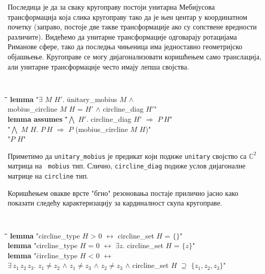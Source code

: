Последица је да за сваку кругоправу постоји унитарна Мебијусова
трансформација која слика кругоправу тако да је њен центар у
координатном почетку (заправо, постоје две такве трансформације ако су
сопствене вредности различите). Видећемо да унитарне трансформације
одговарају ротацијама Риманове сфере, тако да последња чињеница има
једноставно геометријско објашњење. Кругоправе се могу
дијагонализовати коришћењем само транслација, али унитарне
трансформације често имају лепша својства.

{\tt
\begin{tabbing}
\hspace{5mm}\=\hspace{5mm}\=\hspace{5mm}\=\hspace{5mm}\=\hspace{5mm}\=\kill
{\bf lemma} "$\exists$ $M$ $H'$. \= unitary\_mobius $M$ $\wedge$ \\
\>mobius\_circline $M$ $H$ = $H'$ $\wedge$ circline\_diag $H'$"\\
{\bf lemma} \={\bf assumes} \="$\bigwedge$ $H'$. circline\_diag $H'$ $\Longrightarrow$ $P\ H$"\\
\>\> "$\bigwedge$ $M$ $H$. $P\ H$ $\Longrightarrow$ $P$ (mobius\_circline $M$ $H$)"\\
\>"$P$ $H$"
\end{tabbing}
} 

\noindent Приметимо да {\tt unitary\_mobius} је предикат који подиже
{\tt unitary} својство са $\mathbb{C}^2$ матрица на {\tt
mobius} тип. Слично, {\tt circline\_diag} подиже услов
дијагоналне матрице на {\tt circline} тип.

Коришћењем овакве врсте "бгно" резоновања постаје прилично јасно како
показати следећу карактеризацију за кардиналност скупа кругоправе.

{\tt
\begin{tabbing}
\hspace{5mm}\=\hspace{5mm}\=\hspace{5mm}\=\hspace{5mm}\=\hspace{5mm}\=\kill
{\bf lemma} "circline\_type $H$ > $0$ $\longleftrightarrow$ circline\_set $H$ = $\{\}$"\\
{\bf lemma} "circline\_type $H$ = $0$ $\longleftrightarrow$ $\exists z$. circline\_set $H$ = $\{z\}$"\\
{\bf lemma} "\=circline\_type $H$ < $0$ $\longleftrightarrow$\\
\> $\exists\,z_1\,z_2\,z_3$. $z_1 \neq z_2$ $\wedge$ $z_1 \neq z_3$ $\wedge$ $z_2 \neq z_3$ $\wedge$ circline\_set $H$ $\supseteq$ $\{z_1, z_2, z_3\}$"\\
\end{tabbing}
}

